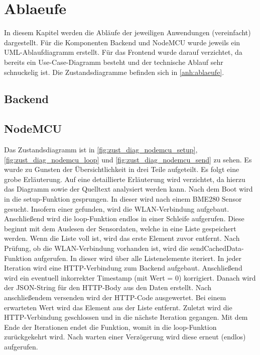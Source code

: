 \section{Ablaeufe}\label{Ablaeufe}
In diesem Kapitel werden die Abläufe der jeweiligen Anwendungen (vereinfacht) dargestellt. Für die Komponenten
Backend und NodeMCU wurde jeweils ein UML-Ablaufdiagramm erstellt. Für das Frontend wurde darauf verzichtet, da bereits
ein Use-Case-Diagramm besteht und der technische Ablauf sehr schnuckelig ist. Die Zustandsdiagramme befinden sich in
\autoref{anh:ablaeufe}.
\subsection{Backend}
\subsection{NodeMCU}
Das Zustandsdiagramm ist in \autoref{fig:zust_diag_nodemcu_setup}, \autoref{fig:zust_diag_nodemcu_loop} und
\autoref{fig:zust_diag_nodemcu_send} zu sehen. Es wurde zu Gunsten der Übersichtlichkeit in drei Teile aufgeteilt.
Es folgt eine grobe Erläuterung.
Auf eine detaillierte Erläuterung wird verzichtet, da hierzu das Diagramm sowie der Quelltext analysiert werden kann.
Nach dem Boot wird in die setup-Funktion gesprungen.
In dieser wird nach einem BME280 Sensor gesucht.
Insofern einer gefunden, wird die WLAN-Verbindung aufgebaut.
Anschließend wird die loop-Funktion endlos in einer Schleife aufgerufen.
Diese beginnt mit dem Auslesen der Sensordaten, welche in eine Liste gespeichert werden.
Wenn die Liste voll ist, wird das erste Element zuvor entfernt.
Nach Prüfung, ob die WLAN-Verbindung vorhanden ist, wird die sendCachedData-Funktion aufgerufen.
In dieser wird über alle Listenelemente iteriert.
In jeder Iteration wird eine HTTP-Verbindung zum Backend aufgebaut.
Anschließend wird ein eventuell inkorrekter Timestamp (mit Wert = 0) korrigiert.
Danach wird der JSON-String für den HTTP-Body aus den Daten erstellt.
Nach anschließendem versenden wird der HTTP-Code ausgewertet.
Bei einem erwarteten Wert wird das Element aus der Liste entfernt.
Zuletzt wird die HTTP-Verbindung geschlossen und in die nächste Iteration gegangen.
Mit dem Ende der Iterationen endet die Funktion, womit in die loop-Funktion zurückgekehrt wird.
Nach warten einer Verzögerung wird diese erneut (endlos) aufgerufen.
